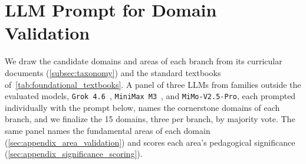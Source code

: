 \section{LLM Prompt for Domain Validation}
\label{sec:appendix_domain_validation}

We draw the candidate domains and areas of each branch from its curricular documents
(\autoref{subsec:taxonomy}) and the standard textbooks of~\autoref{tab:foundational_textbooks}.
A panel of three LLMs from families outside the evaluated models, \texttt{Grok 4.6}~\citep{grok46},
\texttt{MiniMax M3}~\citep{minimaxm3}, and \texttt{MiMo-V2.5-Pro}, each prompted individually with
the prompt below, names the cornerstone domains of each branch, and we finalize the 15 domains,
three per branch, by majority vote.
The same panel names the fundamental areas of each domain (\autoref{sec:appendix_area_validation})
and scores each area's pedagogical significance (\autoref{sec:appendix_significance_scoring}).

